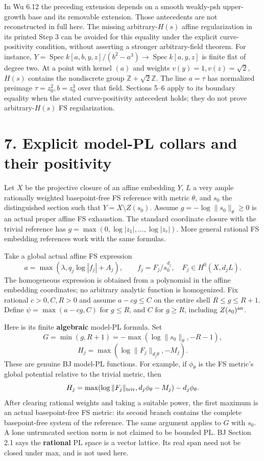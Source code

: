 \documentclass[
  10pt,
]{article}
\begin{document}
In Wu 6.12 the preceding extension depends on a smooth weakly-psh
upper-growth base and its removable extension. Those antecedents are not
reconstructed in full here. The missing arbitrary-\(H(s)\) affine
regularization in its printed Step 3 can be avoided for this equality
under the explicit curve-positivity condition, without asserting a
stronger arbitrary-field theorem. For instance,
\(Y=\operatorname{Spec}k[a,b,y,z]/(b^2-a^3)\to\operatorname{Spec}k[a,y,z]\)
is finite flat of degree two. At a point with kernel \((a)\) and weights
\(v(y)=1,v(z)=\sqrt2\), \(H(s)\) contains the nondiscrete group
\(\mathbb Z+\sqrt2\mathbb Z\). The line \(a=\tau\) has normalized
preimage \(\tau=z_0^2,b=z_0^3\) over that field. Sections 5--6 apply to
its boundary equality when the stated curve-positivity antecedent holds;
they do not prove arbitrary-\(H(s)\) FS regularization.

\section{7. Explicit model-PL collars and their
positivity}\label{explicit-model-pl-collars-and-their-positivity}

Let \(X\) be the projective closure of an affine embedding \(Y\), \(L\)
a very ample rationally weighted basepoint-free FS reference with metric
\(\theta\), and \(s_0\) the distinguished section such that
\(Y=X\setminus Z(s_0)\). Assume \(g=-\log\|s_0\|_\theta\ge0\) is an
actual proper affine FS exhaustion. The standard coordinate closure with
the trivial reference has \(g=\max(0,\log|z_1|,\ldots,\log|z_r|)\). More
general rational FS embedding references work with the same formulas.

Take a global actual affine FS expression
\[a=\max(\lambda,q_j\log|f_j|+A_j),\qquad f_j=F_j/s_0^{d_j},\quad
 F_j\in H^0(X,d_jL).\] The homogeneous expression is obtained from a
polynomial in the affine embedding coordinates; no arbitrary analytic
function is homogenized. Fix rational \(c>0,C,R>0\) and assume
\(a-cg\le C\) on the entire shell \(R\le g\le R+1\). Define
\(\psi=\max(a-cg,C)\) for \(g\le R\), and \(C\) for \(g\ge R\),
including \(Z(s_0)^{\rm an}\).

Here is its finite \textbf{algebraic} model-PL formula. Set
\[G=\min(g,R+1)=-\max(\log\|s_0\|_\theta,-R-1),\]
\[H_j=\max(\log\|F_j\|_{d_j\theta},-M_j).\] These are genuine BJ
model-PL functions. For example, if \(\phi_\theta\) is the FS metric's
global potential relative to the trivial metric, then
\[H_j=\max(\log\|F_j\|_{\rm triv},d_j\phi_\theta-M_j)-d_j\phi_\theta.\]
After clearing rational weights and taking a suitable power, the first
maximum is an actual basepoint-free FS metric: its second branch
contains the complete basepoint-free system of the reference. The same
argument applies to \(G\) with \(s_0\). A lone untruncated section norm
is not claimed to be bounded PL. BJ Section 2.1 says the
\textbf{rational} PL space is a vector lattice. Its real span need not
be closed under max, and is not used here.
\end{document}
